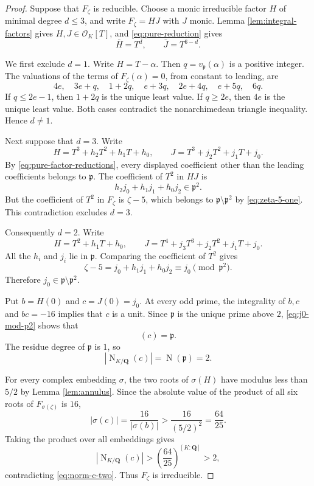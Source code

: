 \documentclass[11pt]{article}
\newcommand{\Q}{\mathbf Q}
\newcommand{\OK}{\mathcal O_K}
\newcommand{\Norm}{\operatorname{N}}
\begin{document}
\begin{proof}
Suppose that $F_\zeta$ is reducible.  Choose a monic irreducible factor
$H$ of minimal degree $d\leq3$, and write $F_\zeta=HJ$ with $J$ monic.
Lemma \ref{lem:integral-factors} gives $H,J\in\OK[T]$, and
\eqref{eq:pure-reduction} gives
\begin{equation}\label{eq:pure-factor-reductions}
 \bar H=T^d,
 \qquad
 \bar J=T^{6-d}.
\end{equation}

We first exclude $d=1$.  Write $H=T-\alpha$.  Then
$q=v_{\mathfrak p}(\alpha)$ is a positive integer.  The valuations of
the terms of $F_\zeta(\alpha)=0$, from constant to leading, are
\[
 4e,\quad 3e+q,\quad 1+2q,\quad e+3q,
 \quad 2e+4q,\quad e+5q,\quad 6q.
\]
If $q\leq2e-1$, then $1+2q$ is the unique least value.  If $q\geq2e$,
then $4e$ is the unique least value.  Both cases contradict the
nonarchimedean triangle inequality.  Hence $d\neq1$.

Next suppose that $d=3$.  Write
\[
 H=T^3+h_2T^2+h_1T+h_0,
 \qquad
 J=T^3+j_2T^2+j_1T+j_0.
\]
By \eqref{eq:pure-factor-reductions}, every displayed coefficient other
than the leading coefficients belongs to $\mathfrak p$.  The coefficient
of $T^2$ in $HJ$ is
\[
 h_2j_0+h_1j_1+h_0j_2\in\mathfrak p^2.
\]
But the coefficient of $T^2$ in $F_\zeta$ is $\zeta-5$, which belongs
to $\mathfrak p\setminus\mathfrak p^2$ by
\eqref{eq:zeta-5-one}.  This contradiction excludes $d=3$.

Consequently $d=2$.  Write
\[
 H=T^2+h_1T+h_0,
 \qquad
 J=T^4+j_3T^3+j_2T^2+j_1T+j_0.
\]
All the $h_i$ and $j_i$ lie in $\mathfrak p$.  Comparing the coefficient
of $T^2$ gives
\begin{equation}\label{eq:j0-mod-p2}
 \zeta-5=j_0+h_1j_1+h_0j_2
 \equiv j_0\pmod{\mathfrak p^2}.
\end{equation}
Therefore $j_0\in\mathfrak p\setminus\mathfrak p^2$.

Put $b=H(0)$ and $c=J(0)=j_0$.  At every odd prime, the integrality of
$b,c$ and $bc=-16$ implies that $c$ is a unit.  Since $\mathfrak p$ is
the unique prime above $2$, \eqref{eq:j0-mod-p2} shows that
\[
 (c)=\mathfrak p.
\]
The residue degree of $\mathfrak p$ is $1$, so
\begin{equation}\label{eq:norm-c-two}
 |\Norm_{K/\Q}(c)|=\Norm(\mathfrak p)=2.
\end{equation}

For every complex embedding $\sigma$, the two roots of $\sigma(H)$ have
modulus less than $5/2$ by Lemma \ref{lem:annulus}.  Since the absolute
value of the product of all six roots of $F_{\sigma(\zeta)}$ is $16$,
\[
 |\sigma(c)|=\frac{16}{|\sigma(b)|}
 >\frac{16}{(5/2)^2}=\frac{64}{25}.
\]
Taking the product over all embeddings gives
\[
 |\Norm_{K/\Q}(c)|
 >\left(\frac{64}{25}\right)^{[K:\Q]}>2,
\]
contradicting \eqref{eq:norm-c-two}.  Thus $F_\zeta$ is irreducible.
\end{proof}
\end{document}
